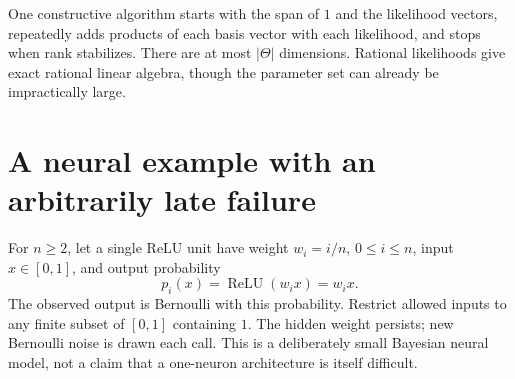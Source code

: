\documentclass[11pt]{article}
\begin{document}
One constructive algorithm starts with the span of $1$ and the likelihood vectors, repeatedly adds products of each basis vector with each likelihood, and stops when rank stabilizes. There are at most $|\Theta|$ dimensions. Rational likelihoods give exact rational linear algebra, though the parameter set can already be impractically large.

\section{A neural example with an arbitrarily late failure}
For $n\ge2$, let a single ReLU unit have weight $w_i=i/n$, $0\le i\le n$, input $x\in[0,1]$, and output probability
\[p_i(x)=\operatorname{ReLU}(w_i x)=w_i x.\]
The observed output is Bernoulli with this probability. Restrict allowed inputs to any finite subset of $[0,1]$ containing $1$. The hidden weight persists; new Bernoulli noise is drawn each call. This is a deliberately small Bayesian neural model, not a claim that a one-neuron architecture is itself difficult.
\end{document}
